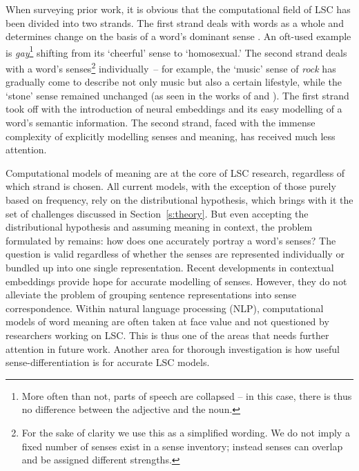 \documentclass[output=paper]{langscibook}
\begin{document}
When surveying prior work, it is obvious that the computational field of LSC has been divided into two strands. 
The first strand deals with words as a whole and determines change on the basis of a word's dominant sense \citep[e.g.][]{kim-etal-2014-temporal, kulkarni2015statistically}.  
An oft-used example is \emph{gay}\footnote{More often than not, parts of speech are collapsed -- in this case, there is thus no difference between the adjective and the noun.} shifting from its `cheerful' sense to `homosexual.' 
The second strand deals with a word's senses\footnote{For the sake of clarity we use this as a simplified wording. We do not imply a fixed number of senses exist in a sense inventory; instead senses can overlap and be assigned different strengths.} individually~-- for example, the `music' sense of \emph{rock} has gradually come to describe not only music but also a certain lifestyle, while the `stone' sense remained unchanged (as seen in the works of \citealt{tahmasebi2013models} and \citealt{mitra2015automatic}).  
The first strand took off with the introduction of neural embeddings and its easy modelling of a word's semantic information. The second strand, faced with the immense complexity of explicitly modelling senses and meaning, has received much less attention. 

Computational models of meaning are at the core of LSC research, regardless of which strand is chosen. All current models, with the exception of those purely based on frequency, rely on the distributional hypothesis, which brings with it the set of challenges discussed in Section~\ref{s:theory}. But even accepting the distributional hypothesis and assuming meaning in context, the problem formulated by \citet{schutze1998} remains: how does one accurately portray a word's senses? The question is valid regardless of whether the senses are represented individually or bundled up into one single representation. Recent developments in contextual embeddings \citep[e.g.][]{peters-etal-2018-deep} provide hope for accurate modelling of senses. However, they do not alleviate the problem of grouping sentence representations into sense correspondence. Within natural language processing (NLP), computational models of word meaning are often taken at face value and not questioned by researchers working on LSC. This is thus one of the areas that needs further attention in future work. Another area for thorough investigation is how useful sense-differentiation is for accurate LSC models. 
\end{document}
